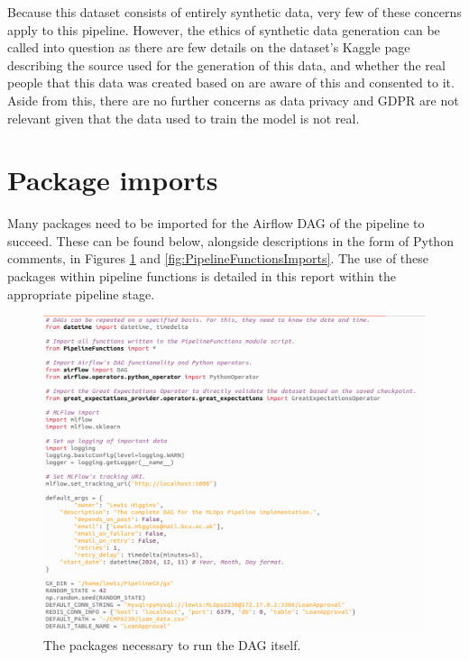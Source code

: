 \documentclass[12pt]{report}
\begin{document}
\noindent Because this dataset consists of entirely synthetic data, very few of these concerns apply to this pipeline. 
However, the ethics of synthetic data generation can be called into question as there are few details on the dataset's Kaggle 
page describing the source used for the generation of this data, and whether the real people that this data was created based 
on are aware of this and consented to it. Aside from this, there are no further concerns as data privacy and GDPR are not 
relevant given that the data used to train the model is not real.







\section{Package imports}
Many packages need to be imported for the Airflow DAG of the pipeline to succeed. These can be found 
below, alongside descriptions in the form of Python comments, in Figures \ref{fig:PipelineDAGImports} and 
\ref{fig:PipelineFunctionsImports}. The use of these packages within pipeline functions is detailed 
in this report within the appropriate pipeline stage.

\begin{figure}[H]
    \centering
    \includegraphics[width=\linewidth]{Implementation/.Code/PipelineDAGImports.png}
    \caption{The packages necessary to run the DAG itself.}
    \label{fig:PipelineDAGImports}
\end{figure}
\end{document}
